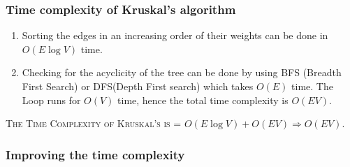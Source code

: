 \documentclass[12pt]{article}
\theoremstyle{plain}
\begin{document}
\subsubsection*{Time complexity of Kruskal's algorithm}

\begin{enumerate}
\item Sorting the edges in an increasing order of their weights can be done in $O(E \log V)$ time.
\item Checking for the acyclicity of the tree can be done by using BFS (Breadth First Search) or DFS(Depth First search) which takes $O(E)$ time. The Loop runs for $O(V)$ time, hence the total time complexity is $O(EV)$.
\end{enumerate}
\textsc{The Time Complexity of Kruskal's is }= $O(E \log V)+O(EV) \Rightarrow O(EV)$.

\subsubsection*{Improving the time complexity}
\end{document}
